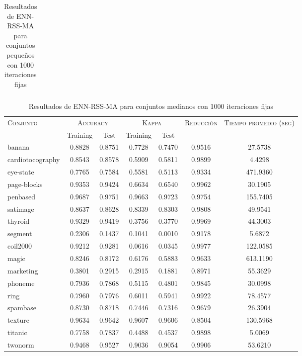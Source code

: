 \begin{table}[]
\begin{tabular}{l c c c c c c}
\hline
\end{tabular}
\caption{Resultados de ENN-RSS-MA para conjuntos pequeños con 1000 iteraciones fijas}
\label{res-peq-ENN-RSS-MA}
\end{table}


\begin{table}[]
\centering
\begin{tabular}{l c c c c c c}
\hline
\multirow{2}{*}{\textsc{Conjunto}}
	& \multicolumn{2}{c}{\textsc{Accuracy}}
	& \multicolumn{2}{c}{\textsc{Kappa}}
	& \textsc{Reducción}
	& \textsc{Tiempo promedio (seg)} \\
	& Training & Test
	& Training & Test \\ 
\hline
\hline

banana & 0.8828 & 0.8751 & 0.7728 & 0.7470 & 0.9516 & 27.5738 \\
cardiotocography & 0.8543 & 0.8578 & 0.5909 & 0.5811 & 0.9899 &4.4298 \\
eye-state & 0.7765 & 0.7584 & 0.5581 & 0.5113 & 0.9334 & 471.9360 \\
page-blocks & 0.9353 & 0.9424 & 0.6634 & 0.6540 & 0.9962 & 30.1905 \\
penbased & 0.9687 & 0.9751 & 0.9663 & 0.9723 & 0.9754 & 155.7405 \\
satimage & 0.8637 & 0.8628 & 0.8339 & 0.8303 & 0.9808 & 49.9541 \\
thyroid & 0.9329 & 0.9419 & 0.3756 & 0.3770 & 0.9969 & 44.3003 \\
segment & 0.2306 & 0.1437 & 0.1041 & 0.0010 & 0.9178 &5.6872 \\
coil2000 & 0.9212 & 0.9281 & 0.0616 & 0.0345 & 0.9977 & 122.0585 \\
magic & 0.8246 & 0.8172 & 0.6176 & 0.5883 & 0.9633 & 613.1190 \\
marketing & 0.3801 & 0.2915 & 0.2915 & 0.1881 & 0.8971 & 55.3629 \\
phoneme & 0.7936 & 0.7868 & 0.5115 & 0.4801 & 0.9845 & 30.0998 \\
ring & 0.7960 & 0.7976 & 0.6011 & 0.5941 & 0.9922 & 78.4577 \\
spambase & 0.8730 & 0.8718 & 0.7446 & 0.7316 & 0.9679 & 26.3904 \\
texture & 0.9634 & 0.9642 & 0.9607 & 0.9606 & 0.8504 & 130.5968 \\
titanic & 0.7758 & 0.7837 & 0.4488 & 0.4537 & 0.9898 &5.0069 \\
twonorm & 0.9468 & 0.9527 & 0.9036 & 0.9054 & 0.9906 & 53.6210 \\

\hline
\end{tabular}
\caption{Resultados de ENN-RSS-MA para conjuntos medianos con 1000 iteraciones fijas}
\label{res-med-ENN-RSS-MA}
\end{table}


